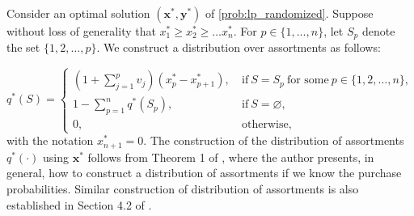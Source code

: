 \documentclass[msom,non-blindrev]{informs3} %
\theoremstyle{definition}
\begin{document}




Consider an optimal solution $(\mathbf{x}^*,\mathbf{y}^*)$ of \eqref{prob:lp_randomized}. Suppose without loss of generality that  $x^*_1 \geq x^*_{2}\geq\dots x^*_{n}$. For  $p \in \{1, \ldots, n\}$, let  $S_p$  denote the set  $\{1,2,\dots,p\}$. We construct a  distribution over assortments as follows:


\begin{equation}
q^*(S)=\begin{cases}
\left(1+\sum_{j=1}^p v_{j}\right)(x^*_{p}-x^*_{{p+1}}),\ &\text{if}\ S=S_p\ \text{for some}\ p\in\{1,2,\dots,n\},\\
1-\sum_{p=1}^n q^*(S_p),\ &\text{if}\ S=\varnothing,\\
0,\ &\text{otherwise},
\end{cases}\label{eq:solution_recover}
\end{equation}
with the notation $x^*_{n+1}=0$. %
The construction of the distribution of assortments \( q^*(\cdot) \) using \( \mathbf{x}^* \) follows from Theorem 1 of \cite{topaloglu2013joint}, where the author {  presents}, in general, how to construct a distribution of assortments if we know the purchase probabilities. {  Similar construction of distribution of assortments is also established in Section 4.2 of \cite{lei2022joint}.}
\end{document}
